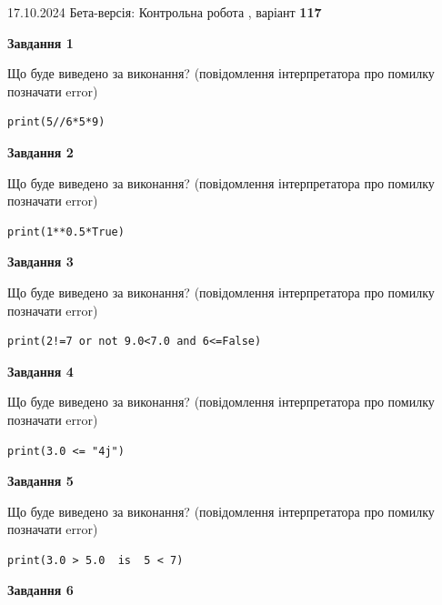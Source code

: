 \documentclass[12pt, ukrainian]{article}
\begin{document}
{\Large{17.10.2024 Бета-версія: Контрольна робота , варіант  \No \textbf { 117 }\par}}
{
\begin {large}
{\begin {center}\textbf{Завдання 1}\end {center}}

Що буде виведено за виконання? (повідомлення інтерпретатора про помилку позначати error)\par
\begin{verbatim}
print(5//6*5*9)
\end{verbatim}

{\begin {center}\textbf{Завдання 2}\end {center}}

Що буде виведено за виконання? (повідомлення інтерпретатора про помилку позначати error)\par
\begin{verbatim}
print(1**0.5*True)
\end{verbatim}

{\begin {center}\textbf{Завдання 3}\end {center}}

Що буде виведено за виконання? (повідомлення інтерпретатора про помилку позначати error)\par
\begin{verbatim}
print(2!=7 or not 9.0<7.0 and 6<=False)
\end{verbatim}

{\begin {center}\textbf{Завдання 4}\end {center}}

Що буде виведено за виконання? (повідомлення інтерпретатора про помилку позначати error)\par
\begin{verbatim}
print(3.0 <= "4j")
\end{verbatim}

{\begin {center}\textbf{Завдання 5}\end {center}}

Що буде виведено за виконання? (повідомлення інтерпретатора про помилку позначати error)\par
\begin{verbatim}
print(3.0 > 5.0  is  5 < 7)
\end{verbatim}

{\begin {center}\textbf{Завдання 6}\end {center}}


\end{large}}
\end{document}
